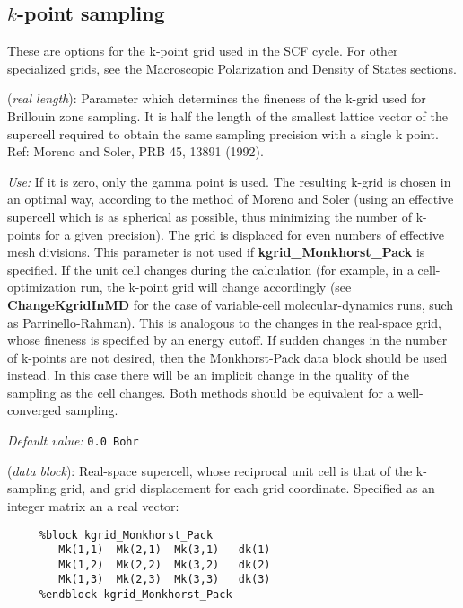 \documentclass[11pt]{article}
\begin{document}
\subsection{$k$-point sampling}

These are options for the k-point grid used in the SCF cycle. For
other specialized grids, see the Macroscopic Polarization and Density
of States sections.

\begin{description}
\itemsep 10pt
\parsep 0pt


\item[{\bf kgrid\_cutoff}] ({\it real length}): 
Parameter which determines
the fineness of the k-grid used for Brillouin zone sampling.
It is half the length of the smallest lattice vector of the supercell 
required to obtain the same sampling precision with a single k point.
Ref: Moreno and Soler, PRB 45, 13891 (1992).

{\it Use:} If it is zero, only the gamma point is used.  The resulting
k-grid is chosen in an optimal way, according to the method of Moreno
and Soler (using an effective supercell which is as spherical as
possible, thus minimizing the number of k-points for a given
precision). The grid is displaced for even numbers of effective mesh
divisions.  This parameter is not used if {\bf kgrid\_Monkhorst\_Pack}
is specified. If the unit cell changes during the calculation (for
example, in a cell-optimization run, the k-point
grid will change accordingly (see {\bf ChangeKgridInMD} for the case
of variable-cell molecular-dynamics runs, such as Parrinello-Rahman). 
This is analogous to the changes in the
real-space grid, whose fineness is specified by an energy cutoff. If
sudden changes in the number of k-points are not desired, then the
Monkhorst-Pack data block should be used instead. In this case there
will be an implicit change in the quality of the sampling as the cell
changes. Both methods should be equivalent for a well-converged
sampling.

{\it Default value:} {\tt 0.0 Bohr}
        

\item[{\bf kgrid\_Monkhorst\_Pack}] ({\it data block}): 
Real-space supercell, whose reciprocal unit cell is that of the
k-sampling grid, and grid displacement for each grid coordinate.
Specified as an integer matrix an a real vector:

\begin{verbatim}
     %block kgrid_Monkhorst_Pack
        Mk(1,1)  Mk(2,1)  Mk(3,1)   dk(1) 
        Mk(1,2)  Mk(2,2)  Mk(3,2)   dk(2) 
        Mk(1,3)  Mk(2,3)  Mk(3,3)   dk(3) 
     %endblock kgrid_Monkhorst_Pack 
\end{verbatim}


\end{description}
\end{document}
